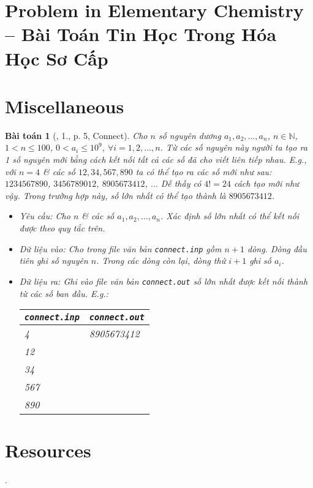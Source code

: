 \documentclass{article}
\newtheorem{baitoan}{Bài toán}
\begin{document}

\section{Problem in Elementary Chemistry -- Bài Toán Tin Học Trong Hóa Học Sơ Cấp}


\section{Miscellaneous}

\begin{baitoan}[\cite{Olympic30-4_2010_Tin_Hoc}, 1., p. 5, Connect]
	Cho $n$ số nguyên dương $a_1,a_2,\ldots,a_n$, $n\in\mathbb{N}$, $1 < n\le100$, $0 < a_i\le10^9$, $\forall i = 1,2,\ldots,n$. Từ các số nguyên này người ta tạo ra 1 số nguyên mới bằng cách kết nối tất cả các số đã cho viết liên tiếp nhau. E.g., với $n = 4$ \& các số $12,34,567,890$ ta có thể tạo ra các số mới như sau: $1234567890$, $3456789012$, $8905673412$, $\ldots$ Dễ thấy có $4! = 24$ cách tạo mới như vậy. Trong trường hợp này, số lớn nhất có thể tạo thành là $8905673412$.
	\begin{itemize}
		\item {\sf Yêu cầu:} Cho $n$ \& các số $a_1,a_2,\ldots,a_n$. Xác định số lớn nhất có thể kết nối được theo quy tắc trên.
		\item {\sf Dữ liệu vào:} Cho trong file văn bản \verb|connect.inp| gồm $n + 1$ dòng. Dòng đầu tiên ghi số nguyên $n$. Trong các dòng còn lại, dòng thứ $i + 1$ ghi số $a_i$.
		\item \emph{Dữ liệu ra:} Ghi vào file văn bản \verb|connect.out| số lớn nhất được kết nối thành từ các số ban đầu. E.g.:
		\begin{table}[H]
			\centering
			\begin{tabular}{|l|l|}
				\hline
				\texttt{connect.inp} & \texttt{connect.out} \\
				\hline
				4 & 8905673412 \\
				12 &  \\
				34 &  \\
				567 &  \\
				890 &  \\
				\hline
			\end{tabular}
		\end{table}
	\end{itemize}
\end{baitoan}


\section{Resources}
\cite{TLGK_chuyen_Tin_quyen_1, TLGK_chuyen_Tin_quyen_2, TLGK_chuyen_Tin_quyen_3, Knuth1997, VietSTEM2021, VietSTEM2022}.


\printbibliography[heading=bibintoc]
	
\end{document}
